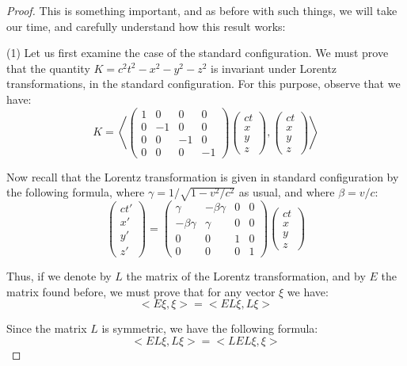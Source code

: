\documentclass[12pt]{amsbook}
\begin{document}
\begin{proof}
This is something important, and as before with such things, we will take our time, and carefully understand how this result works:

\medskip

(1) Let us first examine the case of the standard configuration. We must prove that the quantity $K=c^2t^2-x^2-y^2-z^2$ is invariant under Lorentz transformations, in the standard configuration. For this purpose, observe that we have:
$$K=\left<\begin{pmatrix}
1&0&0&0\\
0&-1&0&0\\
0&0&-1&0\\
0&0&0&-1
\end{pmatrix}
\begin{pmatrix}ct\\ x\\ y\\ z\end{pmatrix}
,\begin{pmatrix}ct\\ x\\ y\\ z\end{pmatrix}\right>$$

Now recall that the Lorentz transformation is given in standard configuration by the following formula, where $\gamma=1/\sqrt{1-v^2/c^2}$ as usual, and where $\beta=v/c$:
$$\begin{pmatrix}ct'\\ x'\\ y'\\ z'\end{pmatrix}=
\begin{pmatrix}
\gamma&-\beta\gamma&0&0\\
-\beta\gamma&\gamma&0&0\\
0&0&1&0\\
0&0&0&1
\end{pmatrix}
\begin{pmatrix}ct\\ x\\ y\\ z\end{pmatrix}$$

Thus, if we denote by $L$ the matrix of the Lorentz transformation, and by $E$ the matrix found before, we must prove that for any vector $\xi$ we have:
$$<E\xi,\xi>=<EL\xi,L\xi>$$

Since the matrix $L$ is symmetric, we have the following formula:
$$<EL\xi,L\xi>=<LEL\xi,\xi>$$


\end{proof}
\end{document}
